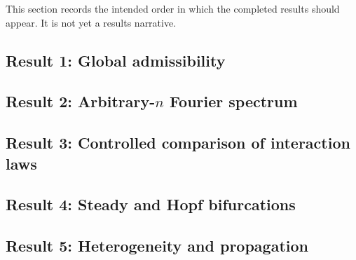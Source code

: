\documentclass[11pt, reqno]{amsart}
\theoremstyle{definition}
\theoremstyle{remark}
\begin{document}
	This section records the intended order in which the completed results should
	appear.  It is not yet a results narrative.
	
	\subsection{Result 1: Global admissibility}
	
	
	\subsection{Result 2: Arbitrary-$n$ Fourier spectrum}
	
	
	\subsection{Result 3: Controlled comparison of interaction laws}
	
	
	\subsection{Result 4: Steady and Hopf bifurcations}
	
	
	\subsection{Result 5: Heterogeneity and propagation}
	
	
\end{document}

